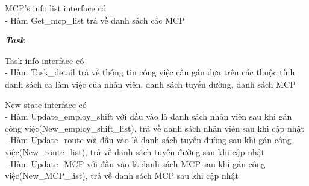 \documentclass[a4paper]{article}
\begin{document}
\begin{itemize}
\begin{minipage}[b]{0.4\textwidth}
MCP's info list interface có \\
- Hàm Get\_mcp\_list trả về danh sách các MCP
\end{minipage}
\hfill
{}
\newline
\newline
\textbf{\textit{Task}} \\
\begin{minipage}[b]{0.4\textwidth}
Task info interface có \\
- Hàm Task\_detail trả về thông tin công việc cần gán dựa trên các thuộc tính danh sách ca làm việc của nhân viên, danh sách tuyến đường, danh sách MCP 
\end{minipage}
\hfill
{}
\begin{minipage}[b]{0.4\textwidth}
New state interface có \\
- Hàm Update\_employ\_shift với đầu vào là danh sách nhân viên sau khi gán công việc(New\_employ\_shift\_list), trả về danh sách nhân viên sau khi cập nhật \\
- Hàm Update\_route với đầu vào là danh sách  tuyến đường sau khi gán công việc(New\_route\_list), trả về danh sách tuyến đường sau khi cập nhật \\
- Hàm Update\_MCP với đầu vào là danh sách  MCP sau khi gán công việc(New\_MCP\_list), trả về danh sách MCP sau khi cập nhật
\end{minipage}
\hfill
{}\\

\end{itemize}
\end{document}
